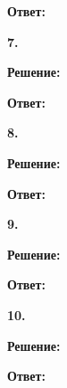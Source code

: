 \documentclass[a4paper,12pt]{article} %
\begin{document}
\begin{flushright}
\begin{large}
\textbf {Ответ: }
\end{large}
\end{flushright}
{\bf 7.} 
\begin{center}
\bfseries
{\Large Решение: }
\end{center}

\begin{flushright}
\begin{large}
\textbf {Ответ: }
\end{large}
\end{flushright}
{\bf 8.} 
\begin{center}
\bfseries
{\Large Решение: }
\end{center}

\begin{flushright}
\begin{large}
\textbf {Ответ: }
\end{large}
\end{flushright}
{\bf 9.} 
\begin{center}
\bfseries
{\Large Решение: }
\end{center}

\begin{flushright}
\begin{large}
\textbf {Ответ: }
\end{large}
\end{flushright}
{\bf 10.} 
\begin{center}
\bfseries
{\Large Решение: }
\end{center}

\begin{flushright}
\begin{large}
\textbf {Ответ: }
\end{large}
\end{flushright}
\end{document}
